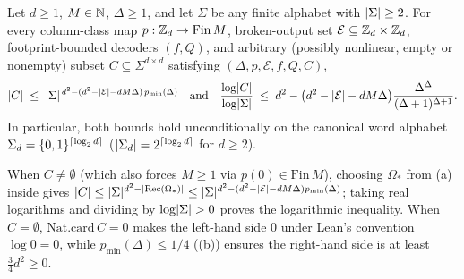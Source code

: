 \begin{theorem}\label{thm:set-capacity}
Let $d \ge 1$, $M \in \mathbb{N}$, $\Delta \ge 1$, and let $\Sigma$ be any finite alphabet with
$\lvert \Sigma \rvert \ge 2$. For every column-class map $p : \mathbb{Z}_d \to \mathrm{Fin}\,M$, broken-output set
$\mathcal{E} \subseteq \mathbb{Z}_d \times \mathbb{Z}_d$, footprint-bounded decoders $(f, Q)$, and arbitrary
(possibly nonlinear, empty or nonempty) subset $C \subseteq \Sigma^{d\times d}$ satisfying
 $(\Delta, p, \mathcal{E}, f, Q, C)$,
\[
  \lvert C \rvert \;\le\; \lvert \Sigma \rvert^{\,d^2 - (d^2 - \lvert \mathcal{E} \rvert - d M \Delta)\,p_{\min}(\Delta)}
  \quad\text{and}\quad
  \frac{\log\lvert C \rvert}{\log\lvert \Sigma \rvert}
  \;\le\; d^2 - \bigl(d^2 - \lvert \mathcal{E} \rvert - d M \Delta\bigr)
  \frac{\Delta^\Delta}{(\Delta+1)^{\Delta+1}}.
\]
In particular, both bounds hold unconditionally on the canonical word alphabet
$\Sigma_d = \{0,1\}^{\lceil \log_2 d \rceil}$ ($\lvert \Sigma_d \rvert = 2^{\lceil \log_2 d \rceil}$ for $d \ge 2$).
\end{theorem}
\begin{outline}
When $C \ne \emptyset$ (which also forces $M \ge 1$ via $p(0) \in \mathrm{Fin}\,M$), choosing
$\Omega_*$ from (a) inside  gives
$\lvert C \rvert \le \lvert \Sigma \rvert^{d^2 - \lvert \operatorname{Rec}(\Omega_*) \rvert} \le \lvert \Sigma \rvert^{d^2 - (d^2 - \lvert \mathcal{E} \rvert - dM\Delta)p_{\min}(\Delta)}$;
taking real logarithms and dividing by $\log\lvert \Sigma \rvert > 0$ proves the logarithmic inequality.
When $C = \emptyset$, $\mathrm{Nat.card}\,C = 0$ makes the left-hand side $0$ under Lean's
convention $\log 0 = 0$, while $p_{\min}(\Delta) \le 1/4$ ((b)) ensures the
right-hand side is at least $\frac{3}{4}d^2 \ge 0$.
\end{outline}


